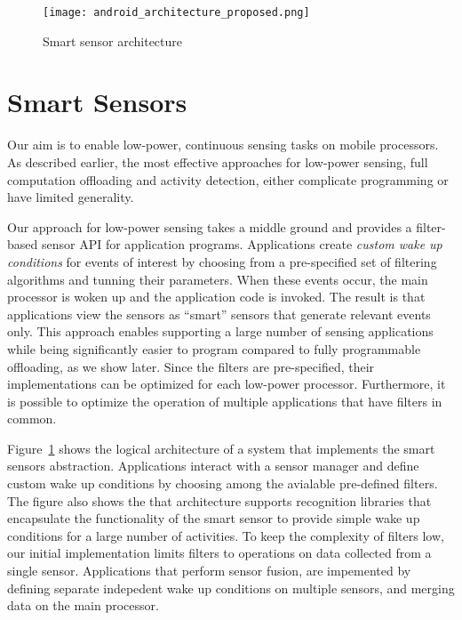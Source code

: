 
\begin{figure}[p]
	\texttt{[image: android\_architecture\_proposed.png]}
	\caption{Smart sensor architecture}
    \label{fig:smartarchitecture}
\end{figure}


\section{Smart Sensors}
\label{sec:approach}

Our aim is to enable low-power, continuous sensing tasks on mobile
processors.  As described earlier, the most effective approaches for
low-power sensing, full computation offloading and activity detection,
either complicate programming or have limited generality.

Our approach for low-power sensing takes a middle ground and provides
a filter-based sensor API for application programs. Applications
create {\em custom wake up conditions} for events of interest by
choosing from a pre-specified set of filtering algorithms and tunning
their parameters.  When these events occur, the main processor is
woken up and the application code is invoked. The result is that
applications view the sensors as ``smart'' sensors that generate
relevant events only. This approach enables supporting a large number
of sensing applications while being significantly easier to program
compared to fully programmable offloading, as we show later. Since the
filters are pre-specified, their implementations can be optimized for
each low-power processor. Furthermore, it is possible to optimize the
operation of multiple applications that have filters in common.

Figure~\ref{fig:smartarchitecture} shows the logical architecture of a
system that implements the smart sensors abstraction.  Applications
interact with a sensor manager and define custom wake up conditions by
choosing among the avialable pre-defined filters.  The figure also
shows the that architecture supports recognition libraries that
encapsulate the functionality of the smart sensor to provide simple
wake up conditions for a large number of activities.  To keep the
complexity of filters low, our initial implementation limits filters
to operations on data collected from a single sensor.  Applications
that perform sensor fusion, are impemented by defining separate
indepedent wake up conditions on multiple sensors, and merging data on
the main processor.





